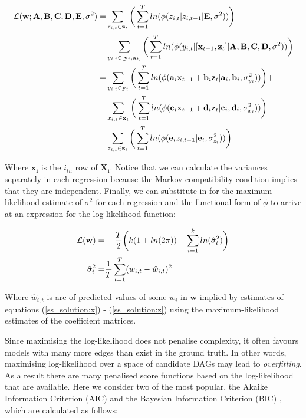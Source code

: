 \documentclass{article}
\begin{document}
\begin{align}
  \mathcal{L}(\mathbf{w}; \mathbf{A}, \mathbf{B}, \mathbf{C}, \mathbf{D}, \mathbf{E}, \mathbf{\sigma}^2) =& \sum_{z_{i,t} \in \mathbf{z}_t} \bigg{(} \sum_{t=1}^{T} ln(\phi(z_{i,t} | z_{i,t-1} | \mathbf{E}, \mathbf{\sigma}^2)) \bigg{)} \nonumber\\
  +& \sum_{y_{i,t} \in [\mathbf{y}_t,\mathbf{x}_t]} \bigg{(} \sum_{t=1}^{T} ln(\phi(y_{i,t} | [\mathbf{x}_{t-1}, \mathbf{z}_{t}] | \mathbf{A}, \mathbf{B}, \mathbf{C}, \mathbf{D}, \mathbf{\sigma}^2)) \bigg{)} \\
  =& \sum_{y_{i,t} \in \mathbf{y}_t} \bigg{(} \sum_{t=1}^{T} ln(\phi(\mathbf{a}_i \mathbf{x}_{t-1} + \mathbf{b}_i \mathbf{z}_t | \mathbf{a}_i, \mathbf{b}_i, \sigma_{y_i}^2)) \bigg{)} + \nonumber\\
  & \sum_{x_{i,t} \in \mathbf{x}_t} \bigg{(} \sum_{t=1}^{T} ln(\phi(\mathbf{c}_i \mathbf{x}_{t-1} + \mathbf{d}_i \mathbf{z}_t | \mathbf{c}_i, \mathbf{d}_i, \sigma_{x_i}^2)) \bigg{)} \nonumber\\
  & \sum_{z_{i,t} \in \mathbf{z}_t} \bigg{(} \sum_{t=1}^{T} ln(\phi(\mathbf{e}_i z_{i,t-1}  | \mathbf{e}_i, \sigma_{z_i}^2)) \bigg{)}
\end{align}

Where $\mathbf{x_i}$ is the $i_{th}$ row of $\mathbf{X_i}$. Notice that we can calculate the variances separately in each regression because the Markov compatibility condition implies that they are independent. Finally, we can substitute in for the maximum likelihood estimate of $\sigma^2$ for each regression and the functional form of $\phi$ to arrive at an expression for the log-likelihood function:

\begin{align}
  \mathcal{L(\mathbf{w})} =& -\frac{T}{2} \bigg{(} 
  k (1 + ln(2\pi)) 
  + \sum_{i=1}^{k} ln(\hat{\sigma}_{i}^2)
  \bigg{)} \\
  \hat{\sigma}_{i}^2 =& \frac{1}{T} \sum_{t=1}^{T} (w_{i,t} - \hat{w}_{i,t})^2
\end{align}

Where $\hat{w}_{i,t}$ is are of predicted values of some $w_i$ in $\mathbf{w}$ implied by estimates of equations (\ref{ss_solution:x}) - (\ref{ss_solution:z}) using the maximum-likelihood estimates of the coefficient matrices.

Since maximising the log-likelihood does not penalise complexity, it often favours models with many more edges than exist in the ground truth. In other words, maximising log-likelihood over a space of candidate DAGs may lead to \textit{overfitting}. As a result there are many penalised score functions based on the log-likelihood that are available. Here we consider two of the most popular, the Akaike Information Criterion (AIC) \parencite{akaike1974new} and the Bayesian Information Criterion (BIC) \parencite{schwarz1978estimating}, which are calculated as follows:
\end{document}
